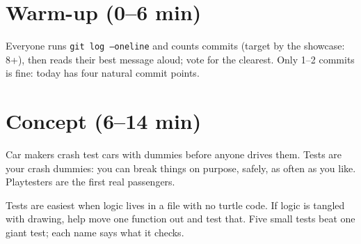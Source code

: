 \section{Warm-up (0--6 min)}
Everyone runs \texttt{git log --oneline} and counts commits (target by the showcase: 8+), then reads their best message aloud; vote for the clearest. Only 1--2 commits is fine: today has four natural commit points.

\section{Concept (6--14 min)}

\begin{analogy}
Car makers crash test cars with dummies before anyone drives them. Tests are your crash dummies: you can break things on purpose, safely, as often as you like. Playtesters are the first real passengers.
\end{analogy}

\begin{teachernote}
Tests are easiest when logic lives in a file with no turtle code. If logic is tangled with drawing, help move one function out and test that. Five small tests beat one giant test; each name says what it checks.
\end{teachernote}

